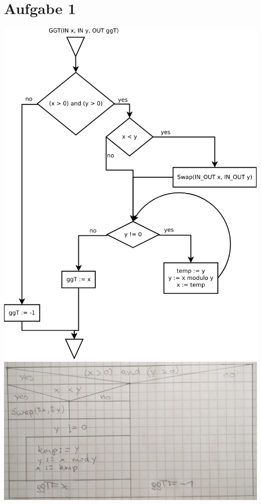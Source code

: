 \documentclass[]{article}
\date{}
\begin{document}
\section{Aufgabe 1}\label{aufgabe-1}

\includegraphics{./ggtFd.png}\\
\includegraphics{./ggtSg.jpg}
\end{document}
